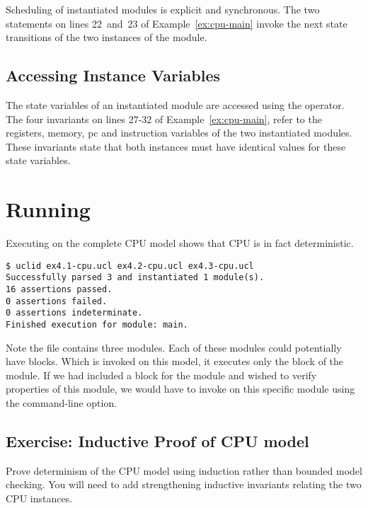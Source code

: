 Scheduling of instantiated modules is explicit and synchronous. The two  statements on lines 22~and~23 of Example~\ref{ex:cpu-main} invoke the next state transitions of the two instances of the  module.

\subsection{Accessing Instance Variables}
The state variables of an instantiated module are accessed using the \codelike{->} operator. The four invariants on lines 27-32 of Example~\ref{ex:cpu-main}, refer to the registers, memory, pc and instruction variables of the two instantiated modules. These invariants state that both instances must have identical values for these state variables.


\section{Running \uclid{}}

Executing \uclid{} on the complete CPU model shows that CPU is in fact deterministic. 

\begin{Verbatim}[frame=single, samepage=true]
$ uclid ex4.1-cpu.ucl ex4.2-cpu.ucl ex4.3-cpu.ucl 
Successfully parsed 3 and instantiated 1 module(s).
16 assertions passed.
0 assertions failed.
0 assertions indeterminate.
Finished execution for module: main.
\end{Verbatim}

Note the file  contains three modules. Each of these modules could potentially have  blocks. Which \uclid{} is invoked on this model, it executes only the  block of the  module.  If we had included a  block for the  module and wished to verify properties of this module, we would have to invoke \uclid{} on this specific module using the  command-line option.

\subsection{Exercise: Inductive Proof of CPU model}
Prove determinism of the CPU model using induction rather than bounded model checking. You will need to add strengthening inductive invariants relating the two CPU instances.
